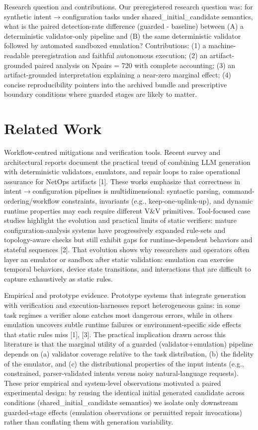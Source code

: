 \documentclass[conference]{IEEEtran}
\begin{document}
Research question and contributions. Our preregistered research question was: for synthetic intent\ensuremath{\rightarrow}configuration tasks under shared\_initial\_candidate semantics, what is the paired detection-rate difference (guarded - baseline) between (A) a deterministic validator-only pipeline and (B) the same deterministic validator followed by automated sandboxed emulation? Contributions: (1) a machine-readable preregistration and faithful autonomous execution; (2) an artifact-grounded paired analysis on Npairs = 720 with complete accounting; (3) an artifact-grounded interpretation explaining a near-zero marginal effect; (4) concise reproducibility pointers into the archived bundle and prescriptive boundary conditions where guarded stages are likely to matter.

\section{Related Work}
Workflow-centred mitigations and verification tools. Recent survey and architectural reports document the practical trend of combining LLM generation with deterministic validators, emulators, and repair loops to raise operational assurance for NetOps artifacts [1]. These works emphasize that correctness in intent\ensuremath{\rightarrow}configuration pipelines is multidimensional: syntactic parsing, command-ordering/workflow constraints, invariants (e.g., keep‑one‑uplink‑up), and dynamic runtime properties may each require different V\&V primitives. Tool-focused case studies highlight the evolution and practical limits of static verifiers: mature configuration-analysis systems have progressively expanded rule-sets and topology-aware checks but still exhibit gaps for runtime-dependent behaviors and stateful sequences [2]. That evolution shows why researchers and operators often layer an emulator or sandbox after static validation: emulation can exercise temporal behaviors, device state transitions, and interactions that are difficult to capture exhaustively as static rules.

Empirical and prototype evidence. Prototype systems that integrate generation with verification and execution-harnesses report heterogeneous gains: in some task regimes a verifier alone catches most dangerous errors, while in others emulation uncovers subtle runtime failures or environment-specific side effects that static rules miss [1], [3]. The practical implication drawn across this literature is that the marginal utility of a guarded (validator+emulation) pipeline depends on (a) validator coverage relative to the task distribution, (b) the fidelity of the emulator, and (c) the distributional properties of the input intents (e.g., constrained, parser-validated intents versus noisy natural-language requests). These prior empirical and system-level observations motivated a paired experimental design: by reusing the identical initial generated candidate across conditions (shared\_initial\_candidate semantics) we isolate only downstream guarded-stage effects (emulation observations or permitted repair invocations) rather than conflating them with generation variability.
\end{document}
